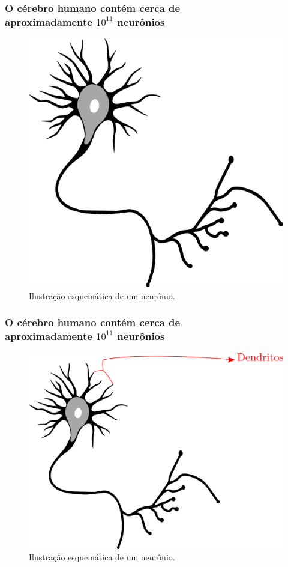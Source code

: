 \documentclass[10pt]{beamer} %
\begin{document}
\begin{frame}
	\frametitle{O cérebro humano contém cerca de \\ aproximadamente $10^{11}$  neurônios}
	\begin{figure}
		\centering
		\includegraphics[scale=0.2]{Imagens/neuronio.png} 
		\caption{Ilustração esquemática de um neurônio.}
	\end{figure}
\end{frame}

\begin{frame}
	\frametitle{O cérebro humano contém cerca de \\ aproximadamente $10^{11}$   neurônios}
	\begin{figure}
		\centering
		\includegraphics[scale=0.2]{Imagens/dendrito.png} 
		\caption{Ilustração esquemática de um neurônio.}
	\end{figure}
\end{frame}
\end{document}
